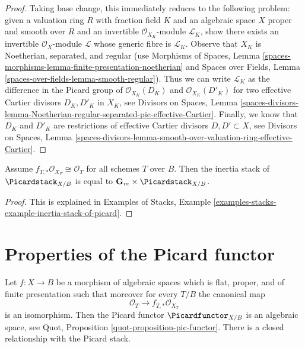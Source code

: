 \begin{proof}
Taking base change, this immediately reduces to the following
problem: given a valuation ring $R$ with fraction field $K$ and
an algebraic space $X$ proper and smooth over $R$ and an invertible
$\mathcal{O}_{X_K}$-module $\mathcal{L}_K$, show there exists
an invertible $\mathcal{O}_X$-module $\mathcal{L}$
whose generic fibre is $\mathcal{L}_K$.
Observe that $X_K$ is Noetherian, separated, and regular
(use Morphisms of Spaces, Lemma
\ref{spaces-morphisms-lemma-finite-presentation-noetherian}
and
Spaces over Fields, Lemma \ref{spaces-over-fields-lemma-smooth-regular}).
Thus we can write
$\mathcal{L}_K$ as the difference in the Picard group of
$\mathcal{O}_{X_K}(D_K)$ and $\mathcal{O}_{X_K}(D'_K)$
for two effective Cartier divisors $D_K, D'_K$ in $X_K$, see
Divisors on Spaces, Lemma
\ref{spaces-divisors-lemma-Noetherian-regular-separated-pic-effective-Cartier}.
Finally, we know that $D_K$ and $D'_K$ are restrictions of
effective Cartier divisors $D, D' \subset X$, see
Divisors on Spaces, Lemma
\ref{spaces-divisors-lemma-smooth-over-valuation-ring-effective-Cartier}.
\end{proof}

\begin{lemma}
\label{lemma-pic-inertia}
Assume $f_{T, *}\mathcal{O}_{X_T} \cong \mathcal{O}_T$ for all
schemes $T$ over $B$. Then the inertia stack of $\Picardstack_{X/B}$
is equal to $\mathbf{G}_m \times \Picardstack_{X/B}$.
\end{lemma}

\begin{proof}
This is explained in Examples of Stacks, Example
\ref{examples-stacks-example-inertia-stack-of-picard}.
\end{proof}






\section{Properties of the Picard functor}
\label{section-picard-functor}

\noindent
Let $f : X \to B$ be a morphism of algebraic spaces which is flat,
proper, and of finite presentation such that moreover for every $T/B$
the canonical map
$$
\mathcal{O}_T \longrightarrow f_{T, *}\mathcal{O}_{X_T}
$$
is an isomorphism. Then the Picard functor $\Picardfunctor_{X/B}$ is an
algebraic space, see Quot, Proposition \ref{quot-proposition-pic-functor}.
There is a closed relationship with the Picard stack.

